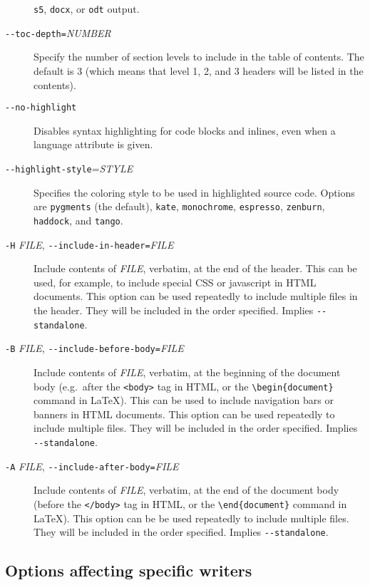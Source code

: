 \documentclass[]{article}
\begin{document}
\begin{description}
\texttt{s5}, \texttt{docx}, or \texttt{odt} output.
\item[\texttt{-{}-toc-depth=}\emph{NUMBER}]
Specify the number of section levels to include in the table of
contents. The default is 3 (which means that level 1, 2, and 3 headers
will be listed in the contents).
\item[\texttt{-{}-no-highlight}]
Disables syntax highlighting for code blocks and inlines, even when a
language attribute is given.
\item[\texttt{-{}-highlight-style}=\emph{STYLE}]
Specifies the coloring style to be used in highlighted source code.
Options are \texttt{pygments} (the default), \texttt{kate},
\texttt{monochrome}, \texttt{espresso}, \texttt{zenburn},
\texttt{haddock}, and \texttt{tango}.
\item[\texttt{-H} \emph{FILE},
\texttt{-{}-include-in-header=}\emph{FILE}]
Include contents of \emph{FILE}, verbatim, at the end of the header.
This can be used, for example, to include special CSS or javascript in
HTML documents. This option can be used repeatedly to include multiple
files in the header. They will be included in the order specified.
Implies \texttt{-{}-standalone}.
\item[\texttt{-B} \emph{FILE},
\texttt{-{}-include-before-body=}\emph{FILE}]
Include contents of \emph{FILE}, verbatim, at the beginning of the
document body (e.g.~after the \texttt{\textless{}body\textgreater{}} tag
in HTML, or the \texttt{\textbackslash{}begin\{document\}} command in
LaTeX). This can be used to include navigation bars or banners in HTML
documents. This option can be used repeatedly to include multiple files.
They will be included in the order specified. Implies
\texttt{-{}-standalone}.
\item[\texttt{-A} \emph{FILE},
\texttt{-{}-include-after-body=}\emph{FILE}]
Include contents of \emph{FILE}, verbatim, at the end of the document
body (before the \texttt{\textless{}/body\textgreater{}} tag in HTML, or
the \texttt{\textbackslash{}end\{document\}} command in LaTeX). This
option can be be used repeatedly to include multiple files. They will be
included in the order specified. Implies \texttt{-{}-standalone}.
\end{description}

\subsection{Options affecting specific
writers}\label{options-affecting-specific-writers}
\end{document}
